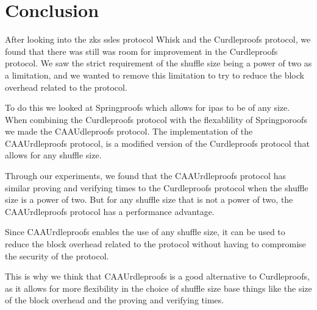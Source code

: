 

\section{Conclusion}\label{sec:conclusion}
After looking into the \glspl{zk} \glspl{ssle} protocol Whisk and the Curdleproofs protocol, we found that there was still was room for improvement in the Curdleproofs protocol.
We saw the strict requirement of the shuffle size being a power of two as a limitation, and we wanted to remove this limitation to try to reduce the block overhead related to the protocol.

To do this we looked at Springproofs which allows for \glspl{ipa} to be of any size.
When combining the Curdleproofs protocol with the flexablility of Springporoofs we made the CAAUdleproofs protocol.
The implementation of the CAAUrdleproofs protocol, is a modified version of the Curdleproofs protocol that allows for any shuffle size.

Through our experiments, we found that the CAAUrdleproofs protocol has similar proving and verifying times to the Curdleproofs protocol when the shuffle size is a power of two.
But for any shuffle size that is not a power of two, the CAAUrdleproofs protocol has a performance advantage.

Since CAAUrdleproofs enables the use of any shuffle size, it can be used to reduce the block overhead related to the protocol without having to compromise the security of the protocol.

This is why we think that CAAUrdleproofs is a good alternative to Curdleproofs, as it allows for more flexibility in the choice of shuffle size base things like the size of the block overhead and the proving and verifying times.
